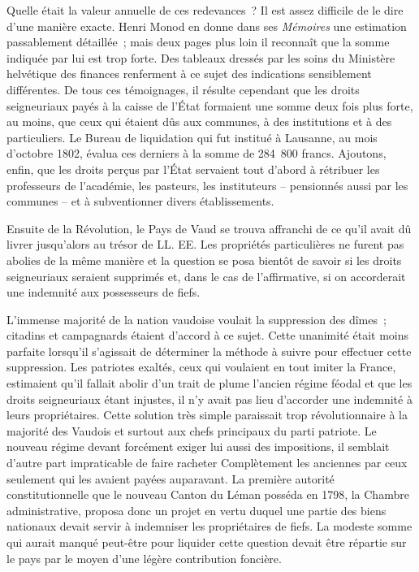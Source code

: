 \documentclass[french,twoside]{book} %
\begin{document}
Quelle était la valeur annuelle de ces redevances ? Il est assez difficile de le dire d’une manière exacte. Henri Monod en donne dans ses \emph{Mémoires} une estimation passablement détaillée ; mais deux pages plus loin il reconnaît que la somme indiquée par lui est trop forte. Des tableaux dressés par les soins du Ministère helvétique des finances renferment à ce sujet des indications sensiblement différentes. De tous ces témoignages, il résulte cependant que les droits seigneuriaux payés à la caisse de l’État formaient une somme deux fois plus forte, au moins, que ceux qui étaient dûs aux communes, à des institutions et à des particuliers. Le Bureau de liquidation qui fut institué à Lausanne, au mois d’octobre 1802, évalua ces derniers à la somme de 284 800 francs. Ajoutons, enfin, que les droits perçus par l’État servaient tout d’abord à rétribuer les professeurs de l’académie, les pasteurs, les instituteurs – pensionnés aussi par les communes – et à subventionner divers établissements.\par
Ensuite de la Révolution, le Pays de Vaud se trouva affranchi de ce qu’il avait dû livrer jusqu’alors au trésor de LL. EE. Les propriétés particulières ne furent pas abolies de la même manière et la question se posa bientôt de savoir si les droits seigneuriaux seraient supprimés et, dans le cas de l’affirmative, si on accorderait une indemnité aux possesseurs de fiefs.\par
L’immense majorité de la nation vaudoise voulait la suppression des dîmes ; citadins et campagnards étaient d’accord à ce sujet. Cette unanimité était moins parfaite lorsqu’il s’agissait de déterminer la méthode à suivre pour effectuer cette suppression. Les patriotes exaltés, ceux qui voulaient en tout imiter la France, estimaient qu’il fallait abolir d’un trait de plume l’ancien régime féodal et que les droits seigneuriaux étant injustes, il n’y avait pas lieu d’accorder une indemnité à leurs propriétaires. Cette solution très simple paraissait trop révolutionnaire à la majorité des Vaudois et surtout aux chefs principaux du parti patriote. Le nouveau régime devant forcément exiger lui aussi des impositions, il semblait d’autre part impraticable de faire racheter Complètement les anciennes par ceux seulement qui les avaient payées auparavant. La première autorité constitutionnelle que le nouveau Canton du Léman posséda en 1798, la Chambre administrative, proposa donc un projet en vertu duquel une partie des biens nationaux devait servir à indemniser les propriétaires de fiefs. La modeste somme qui aurait manqué peut-être pour liquider cette question devait être répartie sur le pays par le moyen d’une légère contribution foncière.\par
\end{document}
